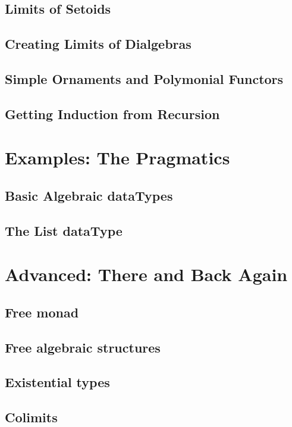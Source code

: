 \documentclass[11pt,oneside]{article}
\begin{document}
\subsection{Limits of Setoids}

\subsection{Creating Limits of Dialgebras}

\subsection{Simple Ornaments and Polymonial Functors}

\subsection{Getting Induction from Recursion}



\section{Examples: The Pragmatics}
\subsection{Basic Algebraic dataTypes}
\subsection{The List dataType}

\section{Advanced: There and Back Again}
\subsection{Free monad}
\subsection{Free algebraic structures}
\subsection{Existential types}
\subsection{Colimits}
\end{document}
